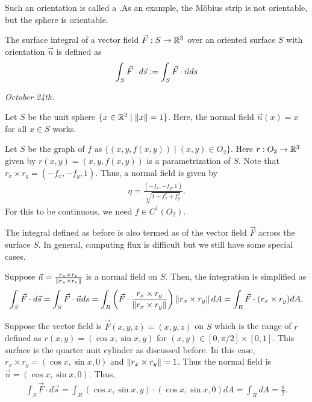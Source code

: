 Such an orientation is called a .As an example, the M\"obius strip is not orientable, but the sphere is orientable.

\begin{definition}
    The surface integral of a vector field $\vec{F}:S \to \mathbb{R}^{3}$ over an oriented surface $S$ with orientation $\vec{n}$ is defined as
    \begin{align}
        \int_{S} \vec{F} \cdot d\vec{s} \vcentcolon= \int_{S} \vec{F} \cdot \vec{n} ds
    \end{align}
\end{definition}

\textit{October 24th.}

\begin{example}
    Let $S$ be the unit sphere $\{x \in \mathbb{R}^{3} \mid \left\lVert x\right\rVert = 1\}$. Here, the normal field $\vec{n}(x) = x$ for all $x \in S$ works.
\end{example}

\begin{example}
    Let $S$ be the graph of $f$ as $\{(x,y,f(x,y)) \mid (x,y) \in O_{2}\}$. Here $r:O_{2} \to \mathbb{R}^{3}$ given by $r(x,y) = (x,y,f(x,y))$ is a parametrization of $S$. Note that $r_{x} \times r_{y} = (-f_{x},-f_{y},1)$. Thus, a normal field is given by
    \begin{align}
        \eta = \frac{(-f_{x},-f_{y},1)}{\sqrt{1+f_{x}^{2}+f_{y}^{2}}}.
    \end{align}
    For this to be continuous, we need $f \in C^{1}(O_{2})$.
\end{example}

The integral defined as before is also termed as  of the vector field $\vec{F}$ across the surface $S$. In general, computing flux is difficult but we still have some special cases.

\begin{remark}
    Suppose $\vec{n} = \frac{r_{u} \times r_{v}}{\left\lVert r_{u} \times r_{v}\right\rVert}$ is a normal field on $S$. Then, the integration is simplified as
    \begin{align}
        \int_{S} \vec{F} \cdot d\vec{s} = \int_{S} \vec{F} \cdot \vec{n} ds = \int_{R} \left( \vec{F} \cdot \frac{r_{x} \times r_{y}}{\left\lVert r_{x} \times r_{y}\right\rVert} \right) \left\lVert r_{x} \times r_{y}\right\rVert dA = \int_{R} \vec{F} \cdot (r_{x} \times r_{y}) dA.
    \end{align}
\end{remark}

\begin{example}
    Suppose the vector field is $\vec{F}(x,y,z) = (x,y,z)$ on $S$ which is the range of $r$ defined as $r(x,y) = (\cos x, \sin x, y)$ for $(x,y) \in [0,\pi/2] \times [0,1]$. This surface is the quarter unit cylinder as discussed before. In this case, $r_{x} \times r_{y} = (\cos x, \sin x, 0)$ and $\left\lVert r_{x} \times r_{y}\right\rVert = 1$. Thus the normal field is $\vec{n} = (\cos x, \sin x, 0)$. Thus,
    \begin{align}
        \int_{S} \vec{F} \cdot d\vec{s} = \int_{R} (\cos x, \sin x, y) \cdot (\cos x, \sin x, 0) dA = \int_{R} dA = \frac{\pi}{2}.
    \end{align}
\end{example}


